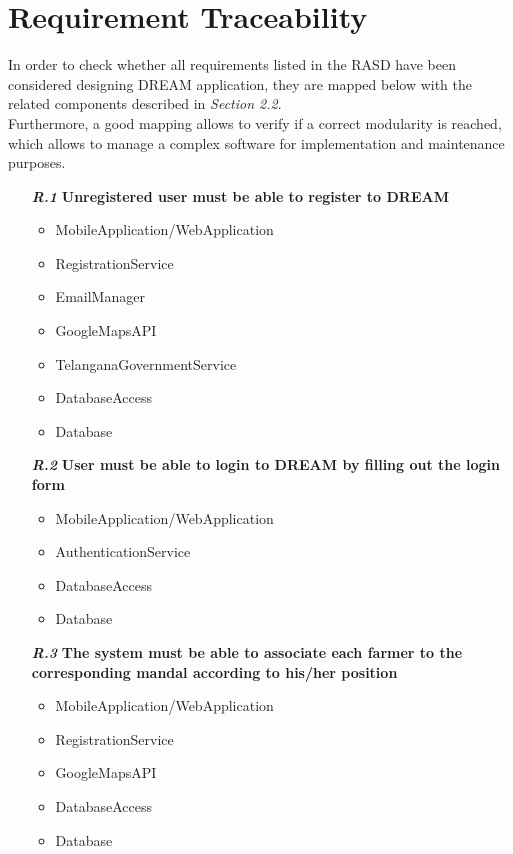 \chapter{Requirement Traceability}
In order to check whether all requirements listed in the RASD have been considered designing DREAM application, they are mapped below with the related components described in \textit{Section 2.2}.\\ 
Furthermore, a good mapping allows to verify if a correct modularity is reached, which allows to manage a complex software for implementation and maintenance purposes.

\begin{itemize}

\item [\textbf{\textit{R.1}}] \textbf{Unregistered user must be able to register to DREAM}
        \begin{itemize}
            \item MobileApplication/WebApplication
            \item RegistrationService
            \item EmailManager
            \item GoogleMapsAPI
            \item TelanganaGovernmentService
            \item DatabaseAccess
            \item Database
        \end{itemize}
        
\item [\textbf{\textit{R.2}}] \textbf{User must be able to login to DREAM by filling out the login form}
    \begin{itemize}
            \item MobileApplication/WebApplication
            \item AuthenticationService
            \item DatabaseAccess
            \item Database
    \end{itemize}
    
\item [\textbf{\textit{R.3}}] \textbf{The system must be able to associate each farmer to the corresponding mandal according to his/her position}
\begin{itemize}
            \item MobileApplication/WebApplication
            \item RegistrationService
            \item GoogleMapsAPI
            \item DatabaseAccess
            \item Database
\end{itemize}
        

\end{itemize}

